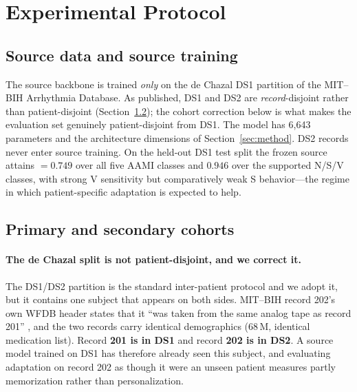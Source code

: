 \section{Experimental Protocol}
\label{sec:protocol}

\subsection{Source data and source training}

The source backbone is trained \emph{only} on the de Chazal DS1 partition of the
MIT--BIH Arrhythmia Database. As published, DS1 and DS2 are \emph{record}-disjoint
rather than patient-disjoint (Section~\ref{sec:cohort}); the cohort correction
below is what makes the evaluation set genuinely patient-disjoint from DS1. The
model has 6{,}643
parameters and the architecture dimensions of Section~\ref{sec:method}. DS2
records never enter source training. On the held-out DS1 test split the frozen
source attains \macrof{} $=0.749$ over all five AAMI classes and $0.946$ over
the supported N/S/V classes, with strong V sensitivity but comparatively weak S
behavior---the regime in which patient-specific adaptation is expected to help.

\subsection{Primary and secondary cohorts}
\label{sec:cohort}

\paragraph{The de Chazal split is not patient-disjoint, and we correct it.} The
DS1/DS2 partition is the standard inter-patient protocol and we adopt it, but it
contains one subject that appears on both sides. MIT--BIH record 202's own WFDB
header states that it ``was taken from the same analog tape as record 201''
\cite{mitdb202note}, and
the two records carry identical demographics (68\,M, identical medication list).
Record \textbf{201 is in DS1} and record \textbf{202 is in DS2}. A source model
trained on DS1 has therefore already seen this subject, and evaluating adaptation
on record 202 as though it were an unseen patient measures partly memorization
rather than personalization.

